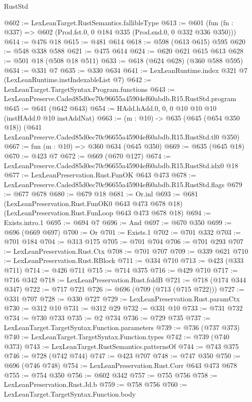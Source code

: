 \begin{lexlean}{RustStd}
\begin{coremodule}
@602 := LexLeanTarget.RustSemantics.fallibleType
@613 := @601 (fun (fn : @337) => @602 (Prod.fst.{0, 0} @184 @335 (Prod.snd.{0, 0} @332 @336 @350)))
@614 := @476 @18
@615 := @481 @614
@618 := @598 (@613 @615) @595
@620 := @548 @338 @588
@621 := @475 @614
@624 := @620 @621 @615 @613
@628 := @501 @18 (@508 @18 @511)
@633 := @618 (@624 @628) (@360 @588 @595)
@634 := @331 @7
@635 := @330 @634
@641 := LexLeanRuntime.index @321 @7 (LexLeanRuntime.instIndexableList @7)
@642 := LexLeanTarget.TargetSyntax.Program.functions
@643 := LexLeanPreserve.Caded85d0ec70c96655a45904ef60abdb.R15.RustStd.program
@645 := @641 (@642 @643)
@654 := HAdd.hAdd.{0, 0, 0} @10 @10 @10 (instHAdd.{0} @10 instAddNat)
@663 := (m : @10) ->
  @635
    (@645 (@654 @350 @18))
    (@641 LexLeanPreserve.Caded85d0ec70c96655a45904ef60abdb.R15.RustStd.tl0 @350)
@667 := fun (m : @10) => @360 @634 (@645 @350)
@669 := @635 (@645 @18)
@670 := @423 @7
@672 := @669 (@670 @127)
@674 := LexLeanPreserve.Caded85d0ec70c96655a45904ef60abdb.R15.RustStd.idx0 @18
@677 := LexLeanPreservation.Rust.FunOK @643 @473
@678 := LexLeanPreserve.Caded85d0ec70c96655a45904ef60abdb.R15.RustStd.flags
@679 := @677 @678
@680 := @679 @18
@681 := Or.inl
@693 := @681
    (LexLeanPreservation.Rust.FunOK0 @643 @473 @678 @18)
    (LexLeanPreservation.Rust.FunLoop @643 @473 @678 @18)
@694 := Exists.intro.{1}
@695 := @694 @7
@696 := And
@697 := @670 @350
@699 := @696 (@669 @697)
@700 := Or
@701 := Exists.{1}
@702 := @701 @332
@703 := @701 @184
@704 := @313 @175
@705 := @701 @704
@706 := @701 @293
@707 := LexLeanPreservation.Rust.Ctx
@708 := @701 @707
@709 := @339 @621
@710 := LexLeanPreservation.Rust.RBlock
@711 := @334 @710
@713 := @423 (@333 @711)
@714 := @426 @711
@715 := @714 @375
@716 := @429 @710
@717 := @716 @342
@718 := LexLeanPreservation.Rust.foldB
@721 := @718 (@174 @344 @347)
@722 := @717 @721
@726 := @696 (@709 (@713 (@715 @722)))
@727 := @331 @707
@728 := @330 @727
@729 := LexLeanPreservation.Rust.paramCtx
@730 := @312 @10
@731 := @312 @29
@732 := @331 @10
@733 := @731 @732
@734 := @730 @733
@735 := @2 @734
@736 := @729 @735
@737 := LexLeanTarget.TargetSyntax.Function.parameters
@739 := @736 (@737 @373)
@740 := LexLeanTarget.TargetSyntax.Function.types
@742 := @739 (@740 @373)
@743 := LexLeanTarget.RustSemantics.patternsOf
@744 := @743 @375
@746 := @728 (@742 @744)
@747 := @423 @707
@748 := @747 @350
@750 := @696 (@746 @748)
@754 := LexLeanPreservation.Rust.Corr @643 @473 @678
@755 := @754 @350
@756 := @602 @342
@757 := @755 @756
@758 := LexLeanPreservation.Rust.Jd.b
@759 := @758 @756
@760 := LexLeanTarget.TargetSyntax.Function.body

\end{coremodule}
\end{lexlean}
